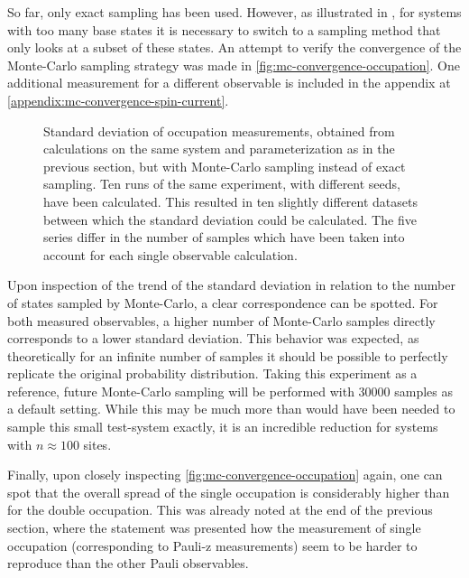 So far, only exact sampling has been used. 
However, as illustrated in , for systems with too many base states it is necessary to switch to a sampling method that only looks at a subset of these states.
An attempt to verify the convergence of the Monte-Carlo sampling strategy was made in \autoref{fig:mc-convergence-occupation}.
One additional measurement for a different observable is included in the appendix at \ref{appendix:mc-convergence-spin-current}.

\begin{figure}[htbp]
    \centering
    \vspace{-0.2cm}
    \caption{
            Standard deviation of occupation measurements, obtained from calculations on the same system and parameterization as in the previous section, but with Monte-Carlo sampling instead of exact sampling.
            Ten runs of the same experiment, with different seeds, have been calculated. 
            This resulted in ten slightly different datasets between which the standard deviation could be calculated.
            The five series differ in the number of samples which have been taken into account for each single observable calculation.
        }
    \label{fig:mc-convergence-occupation}
\end{figure}

Upon inspection of the trend of the standard deviation in relation to the number of states sampled by Monte-Carlo, a clear correspondence can be spotted.
For both measured observables, a higher number of Monte-Carlo samples directly corresponds to a lower standard deviation.
This behavior was expected, as theoretically for an infinite number of samples it should be possible to perfectly replicate the original probability distribution.
Taking this experiment as a reference, future Monte-Carlo sampling will be performed with \num{30000} samples as a default setting.
While this may be much more than would have been needed to sample this small test-system exactly, it is an incredible reduction for systems with $n \approx 100$ sites.

Finally, upon closely inspecting \autoref{fig:mc-convergence-occupation} again, one can spot that the overall spread of the single occupation is considerably higher than for the double occupation.
This was already noted at the end of the previous section, where the statement was presented how the measurement of single occupation (corresponding to Pauli-z measurements) seem to be harder to reproduce than the other Pauli observables.